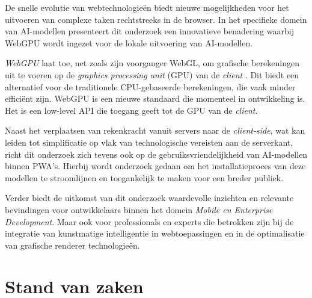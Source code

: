 \bigbreak{}
De snelle evolutie van webtechnologieën biedt nieuwe mogelijkheden voor het uitvoeren van complexe taken rechtstreeks in de browser. In het specifieke domein van AI-modellen presenteert dit onderzoek een innovatieve benadering waarbij WebGPU wordt ingezet voor de lokale uitvoering van AI-modellen.

\bigbreak{}
\textit{WebGPU} laat toe, net zoals zijn voorganger WebGL, om grafische berekeningen uit te voeren op de \textit{graphics processing unit} (GPU) van de \textit{client} \autocite{Nguyen2022}. Dit biedt een alternatief voor de traditionele CPU-gebaseerde berekeningen, die vaak minder efficiënt zijn. WebGPU is een nieuwe standaard die momenteel in ontwikkeling is. Het is een low-level API die toegang geeft tot de GPU van de \textit{client}.

\bigbreak{}
Naast het verplaatsen van rekenkracht vanuit servers naar de \textit{client-side}, wat kan leiden tot simplificatie op vlak van technologische vereisten aan de serverkant, richt dit onderzoek zich tevens ook op de gebruiksvriendelijkheid van AI-modellen binnen PWA's. Hierbij wordt onderzoek gedaan om het installatieproces van deze modellen te stroomlijnen en toegankelijk te maken voor een breder publiek.

\bigbreak{}
Verder biedt de uitkomst van dit onderzoek waardevolle inzichten en relevante bevindingen voor ontwikkelaars binnen het domein \textit{Mobile en Enterprise Development}. Maar ook voor professionals en experts die betrokken zijn bij de integratie van kunstmatige intelligentie in webtoepassingen en in de optimalisatie van grafische renderer technologieën.

\newpage

\section{Stand van zaken}%
\label{sec:stand van zaken}


